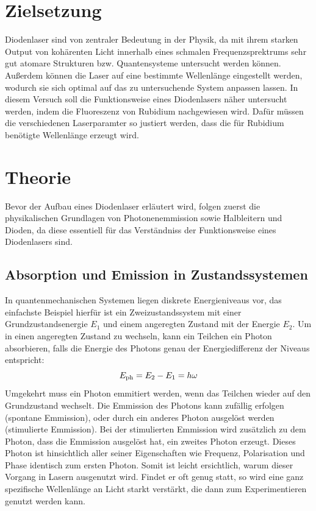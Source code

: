 \section{Zielsetzung}
\label{sec:Zielsetzung}
Diodenlaser sind von zentraler Bedeutung in der Physik, da mit ihrem starken Output von kohärenten
Licht innerhalb eines schmalen Frequenzsprektrums sehr gut atomare Strukturen bzw. Quantensysteme
untersucht werden können. Außerdem können die Laser auf eine bestimmte Wellenlänge eingestellt werden, 
wodurch sie sich optimal auf das zu untersuchende System anpassen lassen.
In diesem Versuch soll die Funktionsweise eines Diodenlasers näher untersucht werden, indem die
Fluoreszenz von Rubidium nachgewiesen wird. Dafür müssen die verschiedenen Laserparamter so justiert werden,
dass die für Rubidium benötigte Wellenlänge erzeugt wird.

\section{Theorie}
\label{sec:Theorie}

Bevor der Aufbau eines Diodenlaser erläutert wird, folgen zuerst die physikalischen Grundlagen von Photonenemmission
sowie Halbleitern und Dioden, da diese essentiell für das Verständniss der Funktionsweise eines Diodenlasers sind.

\subsection{Absorption und Emission in Zustandssystemen}
\label{sec:sub1}

In quantenmechanischen Systemen liegen diskrete Energieniveaus vor, das einfachste Beispiel hierfür ist ein Zweizustandssystem
mit einer Grundzustandsenergie $E_1$ und einem angeregten Zustand mit der Energie $E_2$. Um in einen
angeregten Zustand zu wechseln, kann ein Teilchen ein Photon absorbieren, falls die Energie des Photons genau der
Energiedifferenz der Niveaus entspricht:
\begin{equation}
    \notag
    E_{\text{ph}} = E_2 - E_1 = h \omega
\end{equation}
Umgekehrt muss ein Photon emmitiert werden, wenn das Teilchen wieder auf den Grundzustand wechselt.
Die Emmission des Photons kann zufällig erfolgen (spontane Emmission), oder durch ein anderes Photon
ausgelöst werden (stimulierte Emmission). Bei der stimulierten Emmission wird zusätzlich zu dem Photon,
dass die Emmission ausgelöst hat, ein zweites Photon erzeugt. Dieses Photon ist hinsichtlich aller seiner
Eigenschaften wie Frequenz, Polarisation und Phase identisch zum ersten Photon. Somit ist leicht
ersichtlich, warum dieser Vorgang in Lasern ausgenutzt wird. Findet er oft genug statt, so wird eine
ganz spezifische Wellenlänge an Licht starkt verstärkt, die dann zum Experimentieren genutzt werden kann.

